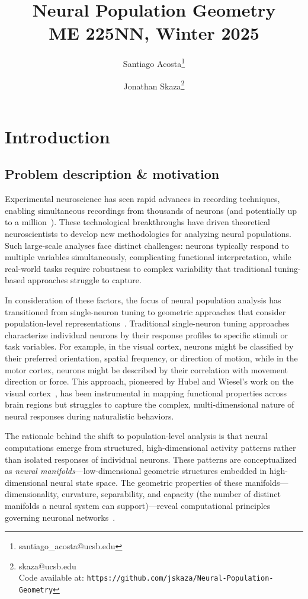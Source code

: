 \documentclass[11pt,a4paper]{article}
\author[1]{Santiago Acosta\thanks{santiago\_acosta@ucsb.edu}}
\author[1]{Jonathan Skaza\thanks{skaza@ucsb.edu\\Code available at: \texttt{https://github.com/jskaza/Neural-Population-Geometry}}}
\affil[1]{Dynamical Neuroscience Graduate Program, University of California, Santa Barbara}
\title {Neural Population Geometry \\[1ex] \large ME 225NN, Winter 2025}
\date{}
\begin{document}
\maketitle
\section{Introduction}

\subsection{Problem description \& motivation}
Experimental neuroscience has seen rapid advances in recording techniques, enabling simultaneous recordings from thousands of neurons (and potentially up to a million~\cite{demas2021high}). These technological breakthroughs have driven theoretical neuroscientists to develop new methodologies for analyzing neural populations. Such large-scale analyses face distinct challenges: neurons typically respond to multiple variables simultaneously, complicating functional interpretation, while real-world tasks require robustness to complex variability that traditional tuning-based approaches struggle to capture.

In consideration of these factors, the focus of neural population analysis has transitioned from single-neuron tuning to geometric approaches that consider population-level representations~\cite{yuste2015neuron, saxena2019towards}. Traditional single-neuron tuning approaches characterize individual neurons by their response profiles to specific stimuli or task variables. For example, in the visual cortex, neurons might be classified by their preferred orientation, spatial frequency, or direction of motion, while in the motor cortex, neurons might be described by their correlation with movement direction or force. This approach, pioneered by Hubel and Wiesel's work on the visual cortex~\cite{hubel1959receptive}, has been instrumental in mapping functional properties across brain regions but struggles to capture the complex, multi-dimensional nature of neural responses during naturalistic behaviors.

The rationale behind the shift to population-level analysis is that neural computations emerge from structured, high-dimensional activity patterns rather than isolated responses of individual neurons. These patterns are conceptualized as \textit{neural manifolds}---low-dimensional geometric structures embedded in high-dimensional neural state space. The geometric properties of these manifolds---dimensionality, curvature, separability, and capacity (the number of distinct manifolds a neural system can support)---reveal computational principles governing neuronal networks~\cite{chung2021neural}. 
\end{document}
